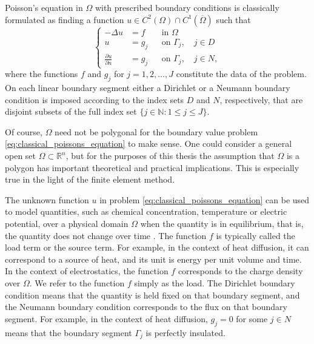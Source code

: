 \documentclass[english, 12pt, a4paper, sci, utf8, a-2b, online]{aaltothesis}
\theoremstyle{definition}
\theoremstyle{plain}
\numberwithin{equation}{section}
\begin{document}
Poisson's equation in $\Omega$ with prescribed boundary conditions
is classically formulated as finding a function
$u \in C^2(\Omega) \cap C^1(\overline{\Omega})$ such that
\begin{equation}
    \label{eq:classical_poissons_equation}
    \left\{
        \begin{aligned}
            -\Delta u &= f && \text{in } \Omega \\
            u &= g_j && \text{on } \Gamma_j, \quad j \in D \\
            \frac{\partial u}{\partial n} &= g_j && \text{on } \Gamma_j,
            \quad j \in N,
        \end{aligned}
    \right.
\end{equation}
where the functions $f$ and $g_j$ for $j=1,2,\dotsc,J$ constitute the data
of the problem. On each linear boundary segment either a Dirichlet or a Neumann
boundary condition is imposed according to the index sets $D$ and $N$, respectively,
that are disjoint subsets of the full index set
$\{ j \in \mathbb{N} : 1 \leq j \leq J \}$.

Of course, $\Omega$ need not be polygonal for the boundary value problem
\eqref{eq:classical_poissons_equation} to make sense. One could consider
a general open set $\Omega \subset \mathbb{R}^n$, but for the purposes of
this thesis the assumption that $\Omega$ is a polygon has important theoretical
and practical implications. This is especially true in the light of
the finite element method.

The unknown function $u$ in problem \eqref{eq:classical_poissons_equation}
can be used to model quantities, such as chemical concentration, temperature or
electric potential, over a physical domain $\Omega$ when the quantity is
in equilibrium, that is, the quantity does not change over time \cite{evans2010}. 
The function $f$ is typically called the load term or the source term. For example,
in the context of heat diffusion, it can correspond to a source of heat,
and its unit is energy per unit volume and time. In the context of electrostatics,
the function $f$ corresponds to the charge density over $\Omega$.
We refer to the function $f$ simply as the load.
The Dirichlet boundary condition means that the quantity is held fixed
on that boundary segment,
and the Neumann boundary condition corresponds to the flux
on that boundary segment. For example, in the context of heat diffusion,
$g_j = 0$ for some $j \in N$ means that the boundary segment $\Gamma_j$ is perfectly 
insulated.
\end{document}

